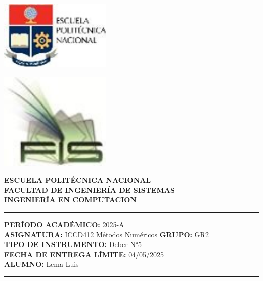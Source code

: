 \documentclass[12pt]{article}
\begin{document}
\begin{minipage}{0.45\textwidth}
    \includegraphics[width=0.4\textwidth]{inFiles/Figures/epnLogo.jpg}
\end{minipage}
\hfill
\begin{minipage}{0.45\textwidth}
    \raggedleft
    \includegraphics[width=0.4\textwidth]{inFiles/Figures/FIS_logo.jpg}
\end{minipage}

\vspace{0.5cm}

\begin{center}
    \textbf{ESCUELA POLITÉCNICA NACIONAL}\\[0.2cm]
    \textbf{FACULTAD DE INGENIERÍA DE SISTEMAS}\\[0.2cm]
    \textbf{INGENIERÍA {\textbf{EN COMPUTACION}}}
\end{center}

\vspace{0.5cm}
\hrule
\vspace{0.5cm}

\noindent\textbf{PERÍODO ACADÉMICO:} 2025-A\\[0.2cm]
\noindent\textbf{ASIGNATURA:} ICCD412 Métodos Numéricos \hfill \textbf{GRUPO:} GR2\\[0.2cm]
\noindent\textbf{TIPO DE INSTRUMENTO:} {Deber N°5}\\[0.2cm]
\noindent\textbf{FECHA DE ENTREGA LÍMITE:} {04/05/2025}\\[0.2cm]
\noindent\textbf{ALUMNO:} {Lema Luis}

\vspace{0.5cm}
\hrule
\vspace{1cm}
\end{document}
